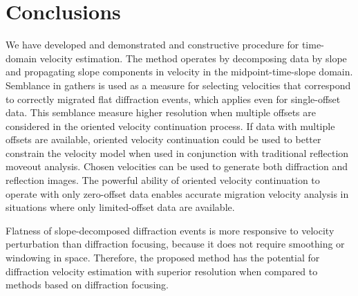 

\section{Conclusions}
We have developed and demonstrated  and constructive
procedure for time-domain velocity estimation.  The method operates
by decomposing data by slope and propagating slope components in velocity in the
midpoint-time-slope domain.  Semblance in  gathers is used as
a measure for selecting velocities that correspond to correctly
migrated flat diffraction events, which applies
even for single-offset data.  This semblance measure  higher resolution when multiple offsets are considered in the oriented velocity continuation process. 
If data with multiple offsets are available, oriented velocity continuation could
be used to better constrain the velocity model when used in conjunction with traditional
reflection moveout analysis.  Chosen velocities can be used to generate both diffraction and reflection images. 
The powerful ability of oriented velocity continuation to operate with only zero-offset
data enables accurate migration velocity analysis in situations where only limited-offset data are available. %
\par
Flatness of slope-decomposed diffraction events is more responsive to
velocity perturbation than diffraction focusing, because it does not
require smoothing or windowing in space. Therefore, the proposed
method has the potential for diffraction velocity estimation with
superior resolution when compared to methods
based on diffraction focusing.

